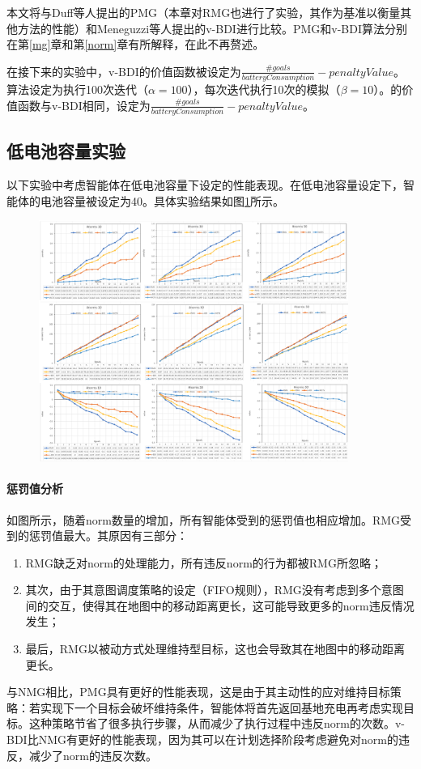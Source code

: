 本文将\SAN 与Duff等人\cite{DBLP:conf/atal/DuffHT06}提出的PMG（本章对RMG也进行了实验，其作为基准以衡量其他方法的性能）和Meneguzzi等人\cite{DBLP:journals/eaai/MeneguzziROVL15}提出的v-BDI进行比较。PMG和v-BDI算法分别在第\ref{mg}章和第\ref{norm}章有所解释，在此不再赘述。

在接下来的实验中，v-BDI的价值函数被设定为$\frac{\#goals}{batteryConsumption} - penaltyValue$。\SAN 算法设定为执行100次迭代（$\alpha = 100$），每次迭代执行10次的模拟（$\beta = 10$）。\SAN 的价值函数与v-BDI相同，设定为$\frac{\#goals}{batteryConsumption} - penaltyValue$。

\subsection{低电池容量实验}
以下实验中考虑智能体在低电池容量下设定的性能表现。在低电池容量设定下，智能体的电池容量被设定为40。具体实验结果如图\ref{fig:ltl_low}所示。

\begin{figure}[htb]
\centering
\includegraphics[width=0.9\textwidth]{./figs/ltl_low_battery}
\label{fig:ltl_low}
\end{figure}

\paragraph{惩罚值分析}
如图所示，随着norm数量的增加，所有智能体受到的惩罚值也相应增加。RMG受到的惩罚值最大。其原因有三部分：
\begin{enumerate}
  \item RMG缺乏对norm的处理能力，所有违反norm的行为都被RMG所忽略；
  \item 其次，由于其意图调度策略的设定（FIFO规则），RMG没有考虑到多个意图间的交互，使得其在地图中的移动距离更长，这可能导致更多的norm违反情况发生；
  \item 最后，RMG以被动方式处理维持型目标，这也会导致其在地图中的移动距离更长。
\end{enumerate}
与NMG相比，PMG具有更好的性能表现，这是由于其主动性的应对维持目标策略：若实现下一个目标会破坏维持条件，智能体将首先返回基地充电再考虑实现目标。这种策略节省了很多执行步骤，从而减少了执行过程中违反norm的次数。v-BDI比NMG有更好的性能表现，因为其可以在计划选择阶段考虑避免对norm的违反，减少了norm的违反次数。
